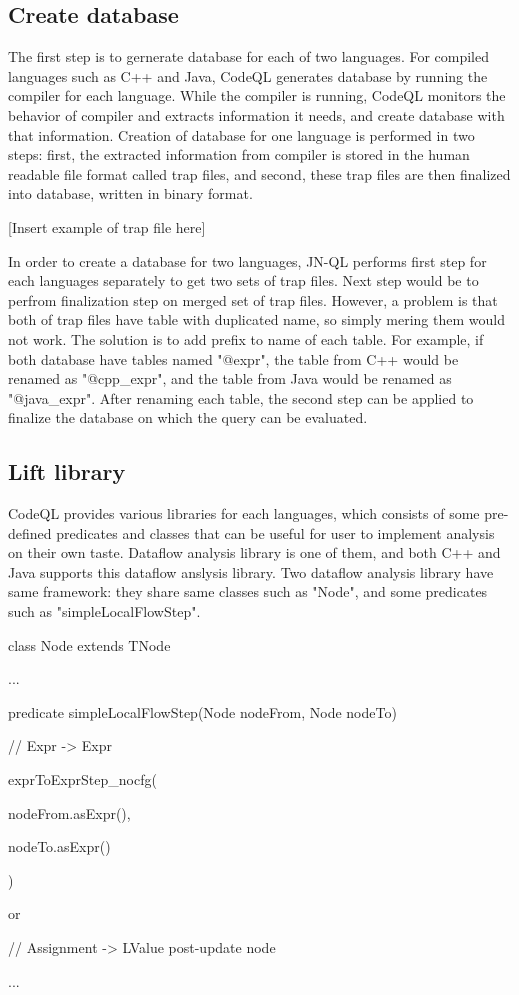 \subsection{Create database}
The first step is to gernerate database for each of two languages.  For
compiled languages such as C++ and Java, CodeQL generates database by running
the compiler for each language. While the compiler is running, CodeQL monitors
the behavior of compiler and extracts information it needs, and create database
with that information.  Creation of database for one language is performed in
two steps: first, the extracted information from compiler is stored in the
human readable file format called trap files, and second, these trap files are
then finalized into database, written in binary format.

[Insert example of trap file here]

In order to create a database for two languages, JN-QL performs first step for
each languages separately to get two sets of trap files.  Next step would be to
perfrom finalization step on merged set of trap files. However, a problem is that
both of trap files have table with duplicated name, so simply mering them would not work.
The solution is to add prefix to name of each table. For example, if both
database have tables named "@expr", the table from C++ would be renamed as
"@cpp\_expr", and the table from Java would be renamed as "@java\_expr". After
renaming each table, the second step can be applied to finalize the database on
which the query can be evaluated.

\subsection{Lift library}
CodeQL provides various libraries for each languages, which consists of some
pre-defined predicates and classes that can be useful for user to implement
analysis on their own taste. Dataflow analysis library is one of them, and both
C++ and Java supports this dataflow anslysis library. Two dataflow analysis
library have same framework: they share same classes such as "Node", and some
predicates such as "simpleLocalFlowStep".

class Node extends TNode {

  ...

}

predicate simpleLocalFlowStep(Node nodeFrom, Node nodeTo) {

  // Expr -> Expr
 
  exprToExprStep\_nocfg(
  
    nodeFrom.asExpr(),
    
    nodeTo.asExpr()
  
  )
  
  or
  
  // Assignment -> LValue post-update node
  
  ...

}

